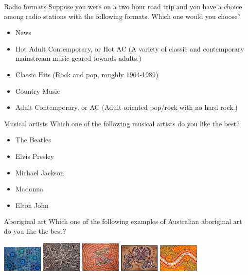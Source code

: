 \documentclass{beamer}
\begin{document}
\begin{frame}{Radio formats}
Suppose you were on a two hour road trip and you have a choice among radio stations with the following formats.
Which one would you choose?

\begin{itemize}
	\item News
	\item Hot Adult Contemporary, or Hot AC
	(A variety of classic and contemporary mainstream music geared towards adults.)
	\item Classic Hits (Rock and pop, roughly 1964-1989)
	\item Country Music
	\item Adult Contemporary, or AC (Adult-oriented pop/rock with no hard rock.)
\end{itemize}
\end{frame}

\begin{frame}{Musical artists}
Which one of the following musical artists do you like the best?

\begin{itemize}
	\item The Beatles
	\item Elvis Presley
	\item Michael Jackson
	\item Madonna
	\item Elton John
\end{itemize}
\end{frame}

\begin{frame}{Aboriginal art}
Which one of the following examples of Australian aboriginal art do you like the best?

\vspace{0.5cm}
\includegraphics[width=2cm]{Aboriginal_art1.jpg}
\includegraphics[width=2cm]{Aboriginal_art2.jpg}
\includegraphics[width=2cm]{Aboriginal_art3.jpg}
\includegraphics[width=2cm]{Aboriginal_art4.jpg}
\includegraphics[width=2cm]{Aboriginal_art5.jpg}
\end{frame}
\end{document}
